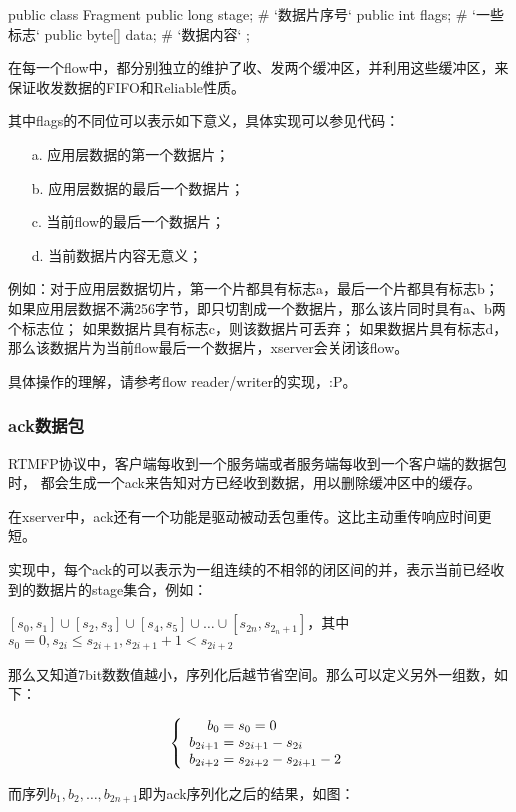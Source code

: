 \begin{javacode}
    public class Fragment {
        public long stage;         # `{\songti 数据片序号}`
        public int flags;          # `{\songti 一些标志}`
        public byte[] data;        # `{\songti 数据内容}`
    };
\end{javacode}

在每一个flow中，都分别独立的维护了收、发两个缓冲区，并利用这些缓冲区，来保证收发数据的FIFO和Reliable性质。

其中flags的不同位可以表示如下意义，具体实现可以参见代码：
\begin{itemize}
    \item [a.] 应用层数据的第一个数据片；
    \item [b.] 应用层数据的最后一个数据片；
    \item [c.] 当前flow的最后一个数据片；
    \item [d.] 当前数据片内容无意义；
\end{itemize}

例如：对于应用层数据切片，第一个片都具有标志a，最后一个片都具有标志b；
如果应用层数据不满256字节，即只切割成一个数据片，那么该片同时具有a、b两个标志位；
如果数据片具有标志c，则该数据片可丢弃；
如果数据片具有标志d，那么该数据片为当前flow最后一个数据片，xserver会关闭该flow。

具体操作的理解，请参考flow reader/writer的实现，:P。

\subsubsection{ack数据包}
RTMFP协议中，客户端每收到一个服务端或者服务端每收到一个客户端的数据包时，
都会生成一个ack来告知对方已经收到数据，用以删除缓冲区中的缓存。

在xserver中，ack还有一个功能是驱动被动丢包重传。这比主动重传响应时间更短。

实现中，每个ack的可以表示为一组连续的不相邻的闭区间的并，表示当前已经收到的数据片的stage集合，例如：
\begin{small}
\begin{center}
$[s_0, s_1]\cup[s_2,s_3]\cup[s_4,s_5]\cup\dots\cup[s_{2n},s_{2_n+1}]$，其中 $s_0=0,s_{2i}\le s_{2i+1},s_{2i+1}+1 < s_{2i+2}$
\end{center}
\end{small}
那么又知道7bit数数值越小，序列化后越节省空间。那么可以定义另外一组数，如下：
\begin{small}
\begin{equation*}
\left\{
\begin{array}{r@{\;=\;}l}
    b_0 & s_0 = 0\\
    b_{2i + 1} & s_{2i + 1} - s_{2i}\\
    b_{2i + 2} & s_{2i + 2} - s_{2i + 1} - 2
\end{array}
\right.
\end{equation*}
\end{small}
而序列$b_1,b_2,\dots,b_{2n+1}$即为ack序列化之后的结果，如图：

